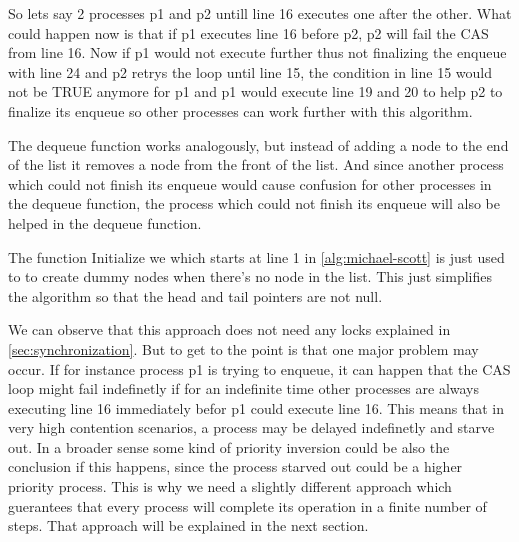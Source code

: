 So lets say 2 processes p1 and p2 untill line 16 executes one after the other. What could happen now is that if p1 executes line 16 before p2, p2 will fail the \ac{CAS} from line 16. Now if p1 would not execute further thus not finalizing the enqueue with line 24 and p2 retrys the loop until line 15, the condition in line 15 would not be TRUE anymore for p1 and p1 would execute line 19 and 20 to help p2 to finalize its enqueue so other processes can work further with this algorithm. \cite{MichaelScottQueue}

The dequeue function works analogously, but instead of adding a node to the end of the list it removes a node from the front of the list. And since another process which could not finish its enqueue would cause confusion for other processes in the dequeue function, the process which could not finish its enqueue will also be helped in the dequeue function. \cite{MichaelScottQueue}

The function Initialize we which starts at line 1 in \cref{alg:michael-scott} is just used to to create dummy nodes when there's no node in the list. This just simplifies the algorithm so that the head and tail pointers are not null. \cite{MichaelScottQueue}

We can observe that this approach does not need any locks explained in \cref{sec:synchronization}. But to get to the point is that one major problem may occur. If for instance process p1 is trying to enqueue, it can happen that the \ac{CAS} loop might fail indefinetly if for an indefinite time other processes are always executing line 16 immediately befor p1 could execute line 16. This means that in very high contention scenarios, a process may be delayed indefinetly and starve out. In a broader sense some kind of priority inversion could be also the conclusion if this happens, since the process starved out could be a higher priority process. This is why we need a slightly different approach which guerantees that every process will complete its operation in a finite number of steps. That approach will be explained in the next section. \cite{MichaelScottQueue}

